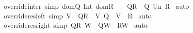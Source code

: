 \begin{isabellebody}
%
\endisadelimproof
\isanewline
\isanewline
{}\isamarkupfalse%
\ override{\isacharunderscore}inter\ {\isacharbrackleft}simp{\isacharbrackright}{\isacharcolon}\ {\isachardoublequoteopen}{\isacharparenleft}{\isacharparenleft}dom{\isacharparenleft}Q{\isacharparenright}\ Int\ dom{\isacharparenleft}R{\isacharparenright}{\isacharparenright}\ {\isacharequal}\ {\isacharbraceleft}{\isacharbraceright}{\isacharparenright}\ {\isacharequal}{\isacharequal}{\isachargreater}\ {\isacharparenleft}{\isacharparenleft}Q{\isacharparenleft}{\isacharplus}{\isacharparenright}R{\isacharparenright}\ {\isacharequal}\ {\isacharparenleft}Q\ Un\ R{\isacharparenright}{\isacharparenright}{\isachardoublequoteclose}\isanewline
%
\isadelimproof
%
\endisadelimproof
%
\isatagproof
{}\isamarkupfalse%
\ auto\isanewline
{}\isamarkupfalse%
%
\endisatagproof
{\isafoldproof}%
%
\isadelimproof
\isanewline
%
\endisadelimproof
\isanewline
{}\isamarkupfalse%
\ override{\isacharunderscore}res{\isacharunderscore}left\ {\isacharbrackleft}simp{\isacharbrackright}{\isacharcolon}\ {\isachardoublequoteopen}{\isacharparenleft}V\ {\isacharless}{\isacharcolon}\ {\isacharparenleft}Q{\isacharparenleft}{\isacharplus}{\isacharparenright}R{\isacharparenright}{\isacharparenright}\ {\isacharequal}\ {\isacharparenleft}{\isacharparenleft}V{\isacharless}{\isacharcolon}\ Q{\isacharparenright}\ {\isacharparenleft}{\isacharplus}{\isacharparenright}\ {\isacharparenleft}V\ {\isacharless}{\isacharcolon}\ R{\isacharparenright}{\isacharparenright}{\isachardoublequoteclose}\isanewline
%
\isadelimproof
%
\endisadelimproof
%
\isatagproof
{}\isamarkupfalse%
\ auto\isanewline
{}\isamarkupfalse%
%
\endisatagproof
{\isafoldproof}%
%
\isadelimproof
\isanewline
%
\endisadelimproof
\isanewline
{}\isamarkupfalse%
\ override{\isacharunderscore}res{\isacharunderscore}right\ {\isacharbrackleft}simp{\isacharbrackright}{\isacharcolon}\ {\isachardoublequoteopen}{\isacharparenleft}{\isacharparenleft}Q{\isacharparenleft}{\isacharplus}{\isacharparenright}R{\isacharparenright}{\isacharcolon}{\isachargreater}\ W{\isacharparenright}\ {\isacharless}{\isacharequal}\ {\isacharparenleft}{\isacharparenleft}Q{\isacharcolon}{\isachargreater}W{\isacharparenright}\ {\isacharparenleft}{\isacharplus}{\isacharparenright}\ {\isacharparenleft}R{\isacharcolon}{\isachargreater}W{\isacharparenright}{\isacharparenright}{\isachardoublequoteclose}\isanewline
%
\isadelimproof
%
\endisadelimproof
%
\isatagproof
{}\isamarkupfalse%
\ auto\isanewline
{}\isamarkupfalse%

\end{isabellebody}
